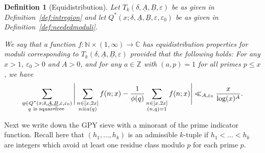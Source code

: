\documentclass{amsart}
\newtheorem{defn}{Definition}
\numberwithin{equation}{section}
\begin{document}
\begin{defn}[Equidistribution]\label{def:equidist}
Let  $T_k(\delta,\underline{A},\underline{B},\varepsilon)$ be as given in Definition~\ref{def:intregion} and let 
$Q^*(x;\delta,\underline{A},\underline{B},\varepsilon,\varepsilon_0)$ be as given in Definition~\ref{def:neededmoduli}. 


We say that a function $f: \mathbb{N} \times (1,\infty) \rightarrow \mathbb{C}$ has equidistribution properties for  moduli corresponding to $T_k(\delta,\underline{A},\underline{B},\varepsilon)$ provided that the following holds: For  any $x>1$, $\varepsilon_0>0$ and  $A>0$, and for any $a \in \mathbb{Z}$ with $(a,p)=1$ for all primes $p \leq x$, we have
\begin{align*}
\sum_{\substack{q \in Q^*(x;\delta,\underline{A},\underline{B},\varepsilon,\varepsilon_0) \\  q \mbox{ \scriptsize  is squarefree  }   }} \Bigg| \sum_{\substack{n \in [x,2x] \\ n \equiv a (q)}} f(n;x) - \dfrac{1}{\phi(q)} \sum_{\substack{n \in [x,2x] \\(n,q)=1 }}f(n;x) \Bigg| \ll_{A,\varepsilon_0} \dfrac{x}{\log(x)^A}.
\end{align*}
\end{defn}

Next we write down the GPY sieve with a minorant of the prime indicator function. Recall here that $(h_1, \dots, h_k)$ is an admissible $k$-tuple if $h_1 < \dots < h_k$ are integers which avoid at least one residue class modulo $p$ for each prime $p$.  
\end{document}
